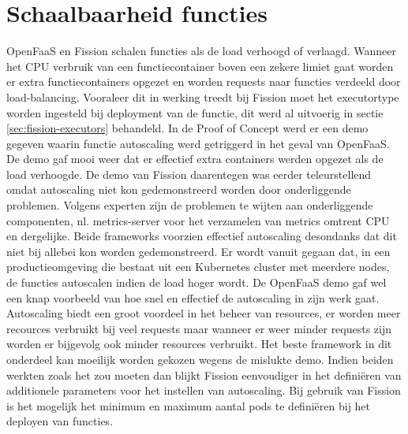 \section{Schaalbaarheid functies}
OpenFaaS en Fission schalen functies als de load verhoogd of verlaagd. Wanneer het CPU verbruik van een functiecontainer boven een zekere limiet gaat worden er extra functiecontainers opgezet en worden requests naar functies verdeeld door load-balancing. Vooraleer dit in werking treedt bij Fission moet het executortype worden ingesteld bij deployment van de functie, dit werd al uitvoerig in sectie \ref{sec:fission-executors} behandeld. In de Proof of Concept werd er een demo gegeven waarin functie autoscaling werd getriggerd in het geval van OpenFaaS. De demo gaf mooi weer dat er effectief extra containers werden opgezet als de load verhoogde. De demo van Fission daarentegen was eerder teleurstellend omdat autoscaling niet kon gedemonstreerd worden door onderliggende problemen. Volgens experten zijn de problemen te wijten aan onderliggende componenten, nl. metrics-server voor het verzamelen van metrics omtrent CPU en dergelijke. Beide frameworks voorzien effectief autoscaling desondanks dat dit niet bij allebei kon worden gedemonstreerd. Er wordt vanuit gegaan dat, in een productieomgeving die bestaat uit een Kubernetes cluster met meerdere nodes, de functies autoscalen indien de load hoger wordt. De OpenFaaS demo gaf wel een knap voorbeeld van hoe snel en effectief de autoscaling in zijn werk gaat. Autoscaling biedt een groot voordeel in het beheer van resources, er worden meer recources verbruikt bij veel requests maar wanneer er weer minder requests zijn worden er bijgevolg ook minder resources verbruikt. Het beste framework in dit onderdeel kan moeilijk worden gekozen wegens de mislukte demo. Indien beiden werkten zoals het zou moeten dan blijkt Fission eenvoudiger in het definiëren van additionele parameters voor het instellen van autoscaling. Bij gebruik van Fission is het mogelijk het minimum en maximum aantal pods te definiëren bij het deployen van functies.